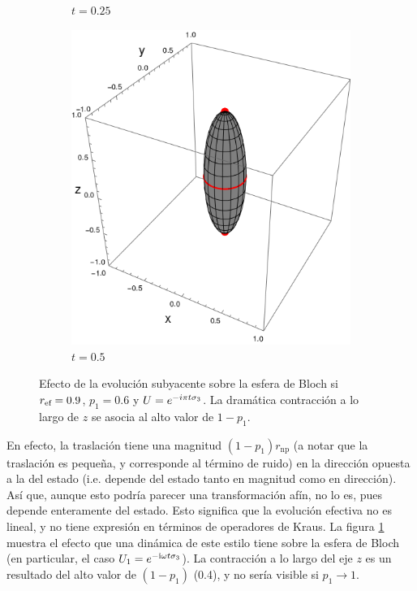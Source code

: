 \begin{figure}[ht!]
\begin{subfigure}{0.32\textwidth}
      \caption{$t=0.25$}
    \end{subfigure}
    \begin{subfigure}{0.32\textwidth}
      \centering
      \includegraphics[width=0.9\linewidth]{chapter3/figures_separable/U1xU2_H1=Pi(sz)_H2=Id_z=0.9_p=0.6t=0.5.png}
      \caption{$t=0.5$}
    \end{subfigure}
    \caption{Efecto de la evolución subyacente sobre la esfera de Bloch si $r_{\text{ef}}=0.9$, $p_{1}=0.6$ y $U=e^{-i\pi t \sigma_{3}}$. La dramática contracción a lo largo de $z$ se asocia al alto valor de $1-p_{1}$.}
    \label{fig:FaseChangeSequence}
\end{figure}

En efecto, la traslación tiene una magnitud $(1-p_{1})r_{\text{np}}$ (a notar que la traslación es pequeña, y corresponde al término de ruido) en la dirección opuesta a la del estado (i.e. depende del estado tanto en magnitud como en dirección). Así que, aunque esto podría parecer una transformación afín, no lo es, pues depende enteramente del estado. Esto significa que la evolución efectiva no es lineal, y no tiene expresión en términos de operadores de Kraus. La figura \ref{fig:FaseChangeSequence} muestra el efecto que una dinámica de este estilo tiene sobre la esfera de Bloch (en particular, el caso $U_{1}=e^{-\text{i}\omega t \sigma_{3}}$). La contracción a lo largo del eje $z$ es un resultado del alto valor de $(1-p_{1})$ (0.4), y no sería visible si $p_{1}\rightarrow 1$.


